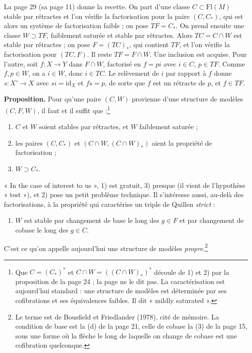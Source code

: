 \documentclass[11pt,a4paper]{article}
\begin{document}
La page 29 (sa page 11) donne la recette. On part d'une classe
$C \subset \mathrm{Fl}(M)$ stable par rétractes et l'on vérifie la
factorisation pour la paire $(C, C_*)$, qui est alors un système de
factorisation faible ; on pose $TF = C_*$. On prend ensuite une classe
$W \supset TF$, faiblement saturée et stable par rétractes. Alors $TC = C
\cap W$ est stable par rétractes ; on pose $F = (TC)_*$, qui contient $TF$,
et l'on vérifie la factorisation pour $(TC, F)$. Il reste $TF = F \cap W$. Une
inclusion est acquise. Pour l'autre, soit $f : X \to Y$ dans $F \cap W$,
factorisé en $f = pi$ avec $i \in C$, $p \in TF$. Comme $f, p \in W$, on a
$i \in W$, donc $i \in TC$. Le relèvement de $i$ par rapport à $f$ donne
$s : X' \to X$ avec $si = \mathrm{id}_X$ et $fs = p$, de sorte que $f$ est un
rétracte de $p$, et $f \in TF$.


\textbf{Proposition.} Pour qu'une paire $(C, W)$ provienne d'une structure de
modèles $(C, F, W)$, il faut et il suffit que :\footnote{Que $C = (C_*)^*$ et $C \cap W = ((C \cap W)_*)^*$ découle de 1) et
2) par la proposition de la page 24 ; la page ne le dit pas. La
caractérisation est aujourd'hui standard : une structure de modèles est
déterminée par ses cofibrations et ses équivalences faibles. Il dit « mildly
saturated ».}
\begin{enumerate}
\item[1)] $C$ et $W$ soient stables par rétractes, et $W$ faiblement
saturée ;
\item[2)] les paires $(C, C_*)$ et $(C \cap W, (C \cap W)_*)$ aient la
propriété de factorisation ;
\item[3)] $W \supset C_*$.
\end{enumerate}

« In the case of interest to us », 1) est gratuit, 3) presque (il vient de
l'hypothèse « test »), et 2) pose un petit problème technique. Il s'intéresse
aussi, au-delà des factorisations, à la propriété qui caractérise un triple
de Quillen \emph{strict} :
\begin{enumerate}
\item[4)] $W$ est stable par changement de base le long des $g \in F$ et par
changement de cobase le long des $g \in C$.
\end{enumerate}
C'est ce qu'on appelle aujourd'hui une structure de modèles
\emph{propre}.\footnote{Le terme est de Bousfield et Friedlander (1978), cité
de mémoire. La condition de base est la (d) de la page 21, celle de cobase
la (3) de la page 15, sous une forme où la flèche le long de laquelle on
change de cobase est une cofibration quelconque.}
\end{document}
